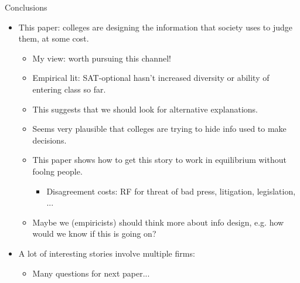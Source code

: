 \documentclass[11pt, aspectratio=169]{beamer}
\theoremstyle{plain}
\theoremstyle{plain}
\theoremstyle{plain}
\theoremstyle{plain}
\begin{document}
\begin{frame}{Conclusions}
    \begin{itemize}
        \item This paper: colleges are designing the information that society uses to judge them, at some cost.
        \begin{itemize}
            \item My view: worth pursuing this channel!
            \item Empirical lit: SAT-optional hasn't increased diversity or ability of entering class so far.
            \item This suggests that we should look for alternative explanations.  
            \item Seems very plausible that colleges are trying to hide info used to make decisions.
            \item This paper shows how to get this story to work in equilibrium without foolng people.
            \begin{itemize}
                \item Disagreement costs: RF for threat of bad press, litigation, legislation, ...
            \end{itemize}
            \item Maybe we (empiricists) should think more about info design, e.g. how would we know if this is going on?
        \end{itemize}
        \item A lot of interesting stories involve multiple firms:
        \begin{itemize}
            \item Many questions for next paper...
        \end{itemize}
    \end{itemize}
\end{frame}
\end{document}
